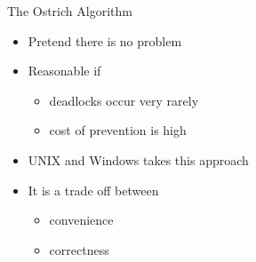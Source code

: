 \begin{frame}{The Ostrich Algorithm}
  \begin{minipage}{.69\linewidth}
    \begin{itemize}
    \item Pretend there is no problem
    \item Reasonable if
      \begin{itemize}
      \item deadlocks occur very rarely
      \item cost of prevention is high
      \end{itemize}
    \item UNIX and Windows takes this approach
    \item It is a trade off between
      \begin{itemize}
      \item convenience
      \item correctness
      \end{itemize}
    \end{itemize}
  \end{minipage}\hfill
  \begin{minipage}{.29\linewidth}
  \end{minipage}
\end{frame}

